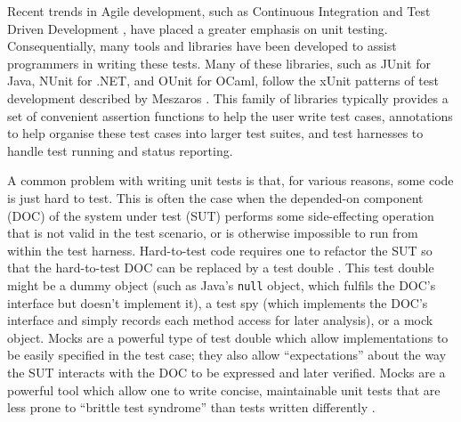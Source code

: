 \documentclass[proposal]{softeng}
\begin{document}

Recent trends in Agile development, such as Continuous Integration
\cite{humble:continuous} and Test Driven Development \cite{beck:tdd},
have placed a greater emphasis on unit testing. Consequentially, many
tools and libraries have been developed to assist programmers in
writing these tests. Many of these libraries, such as JUnit
\cite{www:junit} for Java, NUnit \cite{www:nunit} for .NET, and OUnit
\cite{www:ounit} for OCaml, follow the xUnit patterns of test
development described by Meszaros \cite{meszaros:xunit}. This family
of libraries typically provides a set of convenient assertion
functions to help the user write test cases, annotations to help
organise these test cases into larger test suites, and test harnesses
to handle test running and status reporting.

A common problem with writing unit tests is that, for various reasons,
some code is just hard to test. This is often the case when the
depended-on component (DOC) of the system under test (SUT) performs
some side-effecting operation that is not valid in the test scenario,
or is otherwise impossible to run from within the test
harness. Hard-to-test code requires one to refactor the SUT so that
the hard-to-test DOC can be replaced by a test double
\cite{meszaros:xunit}. This test double might be a dummy object (such
as Java's \verb|null| object, which fulfils the DOC's interface but
doesn't implement it), a test spy (which implements the DOC's
interface and simply records each method access for later analysis),
or a mock object. Mocks are a powerful type of test double which allow
implementations to be easily specified in the test case; they also
allow ``expectations'' about the way the SUT interacts with the DOC to
be expressed and later verified. Mocks are a powerful tool which allow
one to write concise, maintainable unit tests that are less prone to
``brittle test syndrome'' than tests written differently
\cite{meszaros:xunit}.
\end{document}
